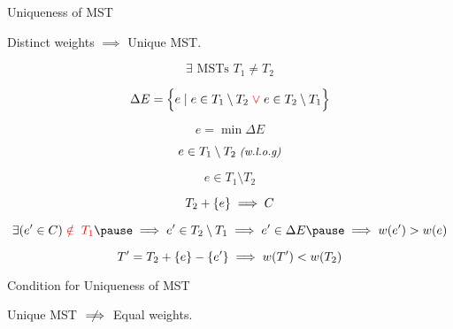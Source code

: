 
\begin{frame}
  \centerline{}
\end{frame}

\begin{frame}
  \begin{exampleblock}{Uniqueness of MST }
    \centerline{Distinct weights $\implies$ Unique MST.}
  \end{exampleblock}

  \pause
  \vspace{0.50cm}
  \centerline{}

  \pause
  \[
    \exists \text{ MSTs } T_1 \neq T_2
  \]

  \pause
  \[
	\Delta E = \Big\{e \mid e \in T_1 \setminus T_2 \;\textcolor{red}{\lor}\; e \in T_2 \setminus T_1\Big\}
  \]

  \pause
  \[
    e = \min \Delta E
  \]

  \pause
  \[
    e \in T_1 \setminus T_2 \;\text{\small \it (w.l.o.g)}
  \]
\end{frame}

\begin{frame}
  \[
    e \in T_1 \setminus T_2
  \]


  \pause
  \vspace{-0.30cm}
  \[
    T_2 + \{e\} \implies C
  \]

  \pause
  \vspace{-0.30cm}
  \[
    \exists (e' \in C) \red{\;\notin\; T_1} \pause \implies e' \in T_{2} \setminus T_{1} \implies e' \in \Delta E \pause \implies w(e') > w(e)
  \]

  \pause
  \vspace{-0.50cm}
  \[
    T' = T_{2} + \{e\} - \{e'\} \implies w(T') < w(T_{2})
  \]
\end{frame}

\begin{frame}{}
  \begin{exampleblock}{Condition for Uniqueness of MST }
    \centerline{Unique MST $\centernot\implies$ Equal weights.}
  \end{exampleblock}

  \pause
\end{frame}

